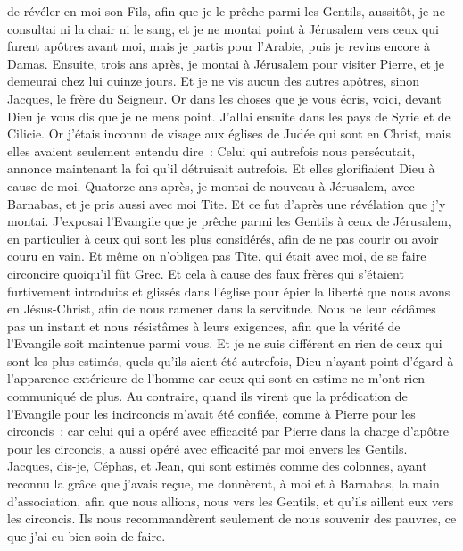 \begin{multicols}{2}
de révéler en moi son Fils, afin que je le prêche parmi les Gentils, aussitôt, je ne consultai ni la chair ni le sang,
et je ne montai point à Jérusalem vers ceux qui furent apôtres avant moi, mais je partis pour l'Arabie, puis je revins encore à Damas.
Ensuite, trois ans après, je montai à Jérusalem pour visiter Pierre, et je demeurai chez lui quinze jours.
Et je ne vis aucun des autres apôtres, sinon Jacques, le frère du Seigneur.
Or dans les choses que je vous écris, voici, devant Dieu je vous dis que je ne mens point.
J'allai ensuite dans les pays de Syrie et de Cilicie.
Or j'étais inconnu de visage aux églises de Judée qui sont en Christ,
mais elles avaient seulement entendu dire~: Celui qui autrefois nous persécutait, annonce maintenant la foi qu'il détruisait autrefois.
Et elles glorifiaient Dieu à cause de moi.
\VerseOne{}Quatorze ans après, je montai de nouveau à Jérusalem, avec Barnabas, et je pris aussi avec moi Tite.
Et ce fut d'après une révélation que j'y montai. J'exposai l'Evangile que je prêche parmi les Gentils à ceux de Jérusalem, en particulier à ceux qui sont les plus considérés, afin de ne pas courir ou avoir couru en vain.
Et même on n'obligea pas Tite, qui était avec moi, de se faire circoncire quoiqu'il fût Grec.
Et cela à cause des faux frères qui s'étaient furtivement introduits et glissés dans l'église pour épier la liberté que nous avons en Jésus-Christ, afin de nous ramener dans la servitude.
Nous ne leur cédâmes pas un instant et nous résistâmes à leurs exigences, afin que la vérité de l'Evangile soit maintenue parmi vous.
Et je ne suis différent en rien de ceux qui sont les plus estimés, quels qu'ils aient été autrefois, Dieu n'ayant point d'égard à l'apparence extérieure de l'homme car ceux qui sont en estime ne m'ont rien communiqué de plus.
Au contraire, quand ils virent que la prédication de l'Evangile pour les incirconcis m'avait été confiée, comme à Pierre pour les circoncis~;
car celui qui a opéré avec efficacité par Pierre dans la charge d'apôtre pour les circoncis, a aussi opéré avec efficacité par moi envers les Gentils.
Jacques, dis-je, Céphas, et Jean, qui sont estimés comme des colonnes, ayant reconnu la grâce que j'avais reçue, me donnèrent, à moi et à Barnabas, la main d'association, afin que nous allions, nous vers les Gentils, et qu'ils aillent eux vers les circoncis.
Ils nous recommandèrent seulement de nous souvenir des pauvres, ce que j'ai eu bien soin de faire.

\end{multicols}
